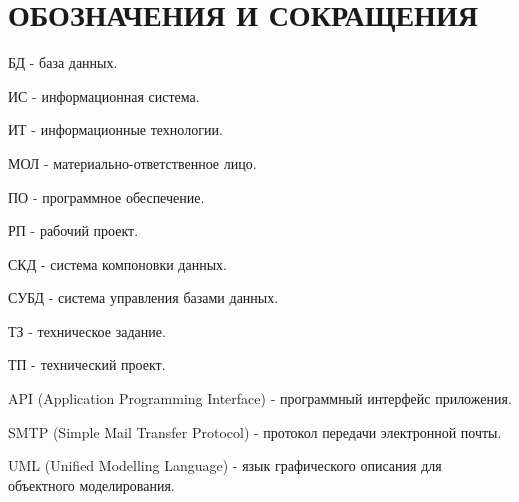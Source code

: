 \section*{ОБОЗНАЧЕНИЯ И СОКРАЩЕНИЯ}

БД - база данных.

ИС - информационная система.

ИТ - информационные технологии.

МОЛ - материально-ответственное лицо.

ПО - программное обеспечение.

РП - рабочий проект.

СКД - система компоновки данных.

СУБД - система управления базами данных.

ТЗ - техническое задание.

ТП - технический проект.

API (Application Programming Interface) - программный интерфейс приложения.

SMTP (Simple Mail Transfer Protocol) - протокол передачи электронной почты.

UML (Unified Modelling Language) - язык графического описания для объектного моделирования.